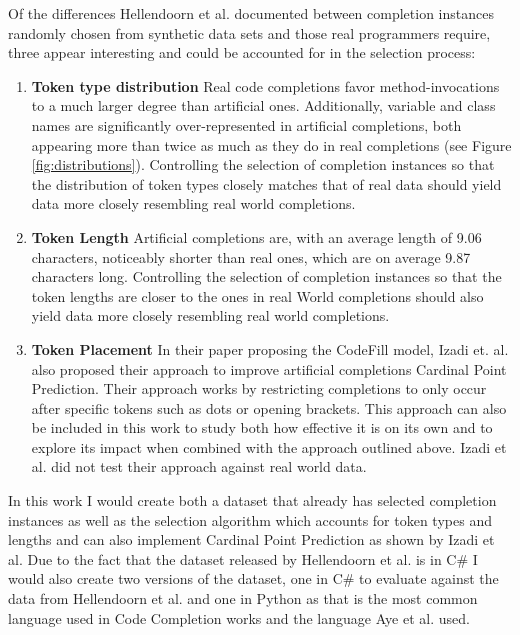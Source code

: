 \documentclass[sigplan,screen,9pt]{acmart}
\begin{document}
Of the differences Hellendoorn et al. documented between completion instances randomly chosen from synthetic data sets and those real programmers require, three appear interesting and could be accounted for in the selection process:
\begin{enumerate}
    \item {\bf Token type distribution}
     Real code completions favor 
     method-invocations to a much larger degree than artificial ones. Additionally, variable and class names are significantly over-represented in artificial completions, both appearing more than twice as much as they do in real completions (see Figure \ref{fig:distributions}).
     Controlling  the selection of completion instances so that the distribution of token types closely matches that of real data should yield data more closely resembling real world completions.
    \item {\bf Token Length}
    Artificial completions are, with an average length of 9.06 characters, noticeably shorter than real ones, which are on average 9.87 characters long.
    Controlling  the selection of completion instances so that the token lengths are closer to the ones in real World completions should also yield data more closely resembling real world completions.
    \item {\bf Token Placement}
    In their paper proposing the CodeFill model, Izadi et. al. \cite{Izadi_2022} also proposed their approach to improve artificial completions Cardinal Point Prediction.
    Their approach works by restricting completions to only occur after specific tokens such as dots or opening brackets. This approach can also be included in this work to study both how effective it is on its own and to explore its impact when combined with the approach outlined above.
    Izadi et al. did not test their approach against real world data.    
\end{enumerate}

In this work I would create both a dataset that already has selected completion instances as well as the selection algorithm which accounts for token types and lengths and can also implement Cardinal Point Prediction as shown by Izadi et al.
Due to the fact that the dataset released by Hellendoorn et al.\cite{8812116} is in C\# I would also create two versions of the dataset, one in C\# to evaluate against the data from Hellendoorn et al. and one in Python as that is the most common language used in Code Completion works and the language Aye et al.\cite{https://doi.org/10.48550/arxiv.2011.04542} used.
\end{document}
